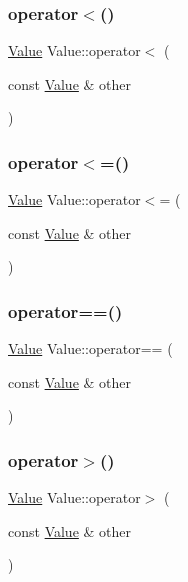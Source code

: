 \mbox{\label{classValue_ab8f33387ddbc00335cb96643e61643f6}} 
\subsubsection{\texorpdfstring{operator$<$()}{operator<()}}
{\footnotesize\ttfamily \hyperlink{classValue}{Value} Value\+::operator$<$ (\begin{DoxyParamCaption}\item[{const \hyperlink{classValue}{Value} \&}]{other }\end{DoxyParamCaption})}

\mbox{\label{classValue_a38e0f17676ad08e88bedffb1e931d543}} 
\subsubsection{\texorpdfstring{operator$<$=()}{operator<=()}}
{\footnotesize\ttfamily \hyperlink{classValue}{Value} Value\+::operator$<$= (\begin{DoxyParamCaption}\item[{const \hyperlink{classValue}{Value} \&}]{other }\end{DoxyParamCaption})}

\mbox{\label{classValue_a872c51bf32543279f522426527b4c857}} 
\subsubsection{\texorpdfstring{operator==()}{operator==()}}
{\footnotesize\ttfamily \hyperlink{classValue}{Value} Value\+::operator== (\begin{DoxyParamCaption}\item[{const \hyperlink{classValue}{Value} \&}]{other }\end{DoxyParamCaption})}

\mbox{\label{classValue_a05800a20d5b799d1a81b28c950899aea}} 
\subsubsection{\texorpdfstring{operator$>$()}{operator>()}}
{\footnotesize\ttfamily \hyperlink{classValue}{Value} Value\+::operator$>$ (\begin{DoxyParamCaption}\item[{const \hyperlink{classValue}{Value} \&}]{other }\end{DoxyParamCaption})}

